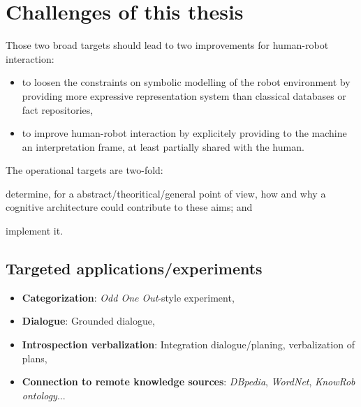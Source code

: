 \section{Challenges of this thesis}
\label{sect|krs-challenges}

Those two broad targets should lead to two improvements for human-robot
interaction:


\begin{itemize}
	\item to loosen the constraints on symbolic modelling of the robot
	environment by providing more expressive representation system than
	classical databases or fact repositories,

	\item to improve human-robot interaction by explicitely providing to the
	machine an interpretation frame, at least partially shared with the human.

\end{itemize}

The operational targets are two-fold:

\begin{inparaenum}

	\item determine, for a abstract/theoritical/general point of view, how and
	why a cognitive architecture could contribute to these aims; and

	\item implement it.

\end{inparaenum}

\subsection{Targeted applications/experiments}
\label{sect|targeted-applications-experiments}

\begin{itemize}
	\item \textbf{Categorization}: \emph{Odd One Out}-style experiment,
	\item \textbf{Dialogue}: Grounded dialogue,
	\item \textbf{Introspection verbalization}: Integration dialogue/planing, verbalization of plans,
	\item \textbf{Connection to remote knowledge sources}: \emph{DBpedia}, \emph{WordNet}, \emph{KnowRob ontology}...
\end{itemize}
